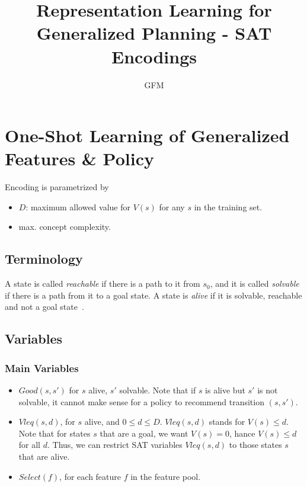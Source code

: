 \documentclass[a4paper]{article}
\title{Representation Learning for Generalized Planning - SAT Encodings}
\author{GFM}
\begin{document}
\maketitle

\section{One-Shot Learning of Generalized Features \& Policy}

Encoding is parametrized by
\begin{itemize}
 \item $D$: maximum allowed value for $V(s)$ for any $s$ in the training set.
 \item max. concept complexity.
\end{itemize}


\subsection{Terminology}
A state is called \emph{reachable} if there is a path to it from $s_0$, and
it is called \emph{solvable} if there is a path from it to a goal
state.
A state is \emph{alive} if it is solvable, reachable and not a
goal state~\cite{frances-et-al-ijcai2019}.


\subsection{Variables}

\subsubsection{Main Variables}
\begin{itemize}
 \item $Good(s, s')$ for $s$ alive, $s'$ solvable.
 Note that if $s$ is alive but $s'$ is not solvable,
 it cannot make sense for a policy to recommend transition $(s, s')$.

 \item $Vleq(s, d)$, for $s$ alive, and $0 \leq d \leq D$.
 $Vleq(s, d)$ stands for $V(s) \leq d$.
 Note that for states $s$ that are a goal, we want $V(s)=0$, hance $V(s)\leq d$ for all $d$.
 Thus, we can restrict SAT variables $Vleq(s, d)$ to those states $s$ that are alive.

 \item $Select(f)$, for each feature $f$ in the feature pool.
\end{itemize}
\end{document}
